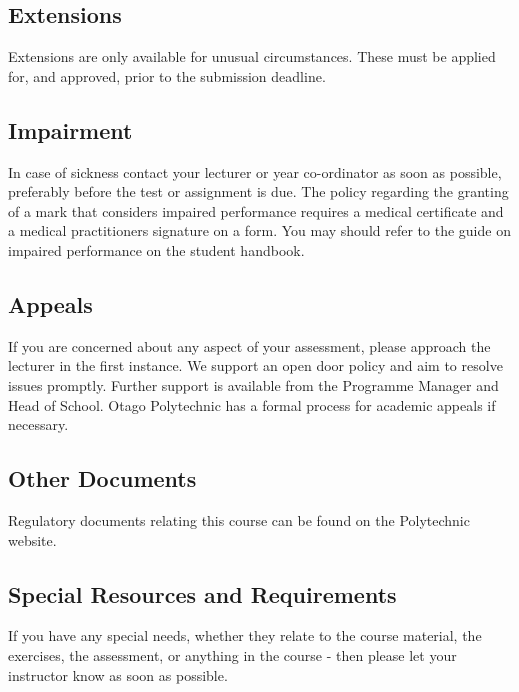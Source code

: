 \documentclass{article}
\begin{document}
\subsection*{Extensions}
Extensions are only available for unusual circumstances.  These must be applied for, and approved, prior to the submission deadline.

\subsection*{Impairment}
In case of sickness contact your lecturer or year co-ordinator as soon as possible, preferably before the test or
assignment is due.  The policy regarding the granting of a mark that considers impaired performance requires a medical
certificate and a medical practitioners signature on a form. You may should refer to the guide on impaired performance
on the student handbook.

\subsection*{Appeals}
If you are concerned about any aspect of your assessment, please approach the lecturer in the first instance.  We support
an open door policy and aim to resolve issues promptly.  Further support is available from the Programme
Manager and Head of School. Otago Polytechnic has a formal process for academic appeals if necessary.

\subsection*{Other Documents}
Regulatory documents relating this course can be found on the Polytechnic website.




\subsection*{Special Resources and Requirements}
If you have any special needs, whether they relate to the course material, the exercises, the assessment, or anything in the course -
then please let your instructor know as soon as possible.
\end{document}
